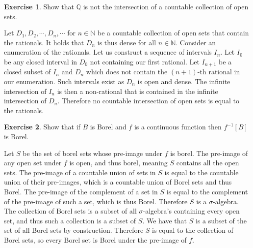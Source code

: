 \documentclass{article}
\theoremstyle{definition}
\newtheorem{exer}{Exercise}[section]
\newcommand{\N}{\mathbb{N}}
\newcommand{\Q}{\mathbb{Q}}
\newlength{\defparindent}
\newenvironment{answer}
    {\begin{mdframed}[backgroundcolor=gray!15, linewidth=0pt] \setlength{\parindent}{\defparindent}}
    {\end{mdframed}}
\begin{document}
\begin{exer}
    Show that $\Q$ is not the intersection of a countable collection of open sets.
    \begin{answer}
        Let $D_1, D_2, \cdots, D_n, \cdots$ for $n \in \N$ be a countable collection of open sets that contain the rationals. It holds that $D_n$ is thus dense for all $n \in \N$. Consider an enumeration of the rationals. Let us construct a sequence of intervals $I_n$. Let $I_0$ be any closed interval in $D_0$ not containing our first rational. Let $I_{n + 1}$ be a closed subset of $I_{n}$ and $D_n$ which does not contain the $(n + 1)$-th rational in our enumeration. Such intervals exist as $D_n$ is open and dense. The infinite intersection of $I_{n}$ is then a non-rational that is contained in the infinite intersection of $D_n$. Therefore no countable intersection of open sets is equal to the rationals. 
    \end{answer}
\end{exer}

\begin{exer}
    Show that if $B$ is Borel and $f$ is a continuous function then $f^{-1}[B]$ is Borel.
    \begin{answer}
        Let $S$ be the set of borel sets whose pre-image under $f$ is borel. The pre-image of any open set under $f$ is open, and thus borel, meaning $S$ contains all the open sets. The pre-image of a countable union of sets in $S$ is equal to the countable union of their pre-images, which is a countable union of Borel sets and thus Borel. The pre-image of the complement of a set in $S$ is equal to the complement of the pre-image of such a set, which is thus Borel. Therefore $S$ is a $\sigma$-algebra. The collection of Borel sets is a subset of all $\sigma$-algebra's containing every open set, and thus such a collection is a subset of $S$. We have that $S$ is a subset of the set of all Borel sets by construction. Therefore $S$ is equal to the collection of Borel sets, so every Borel set is Borel under the pre-image of $f$.
    \end{answer}
\end{exer}
\end{document}
